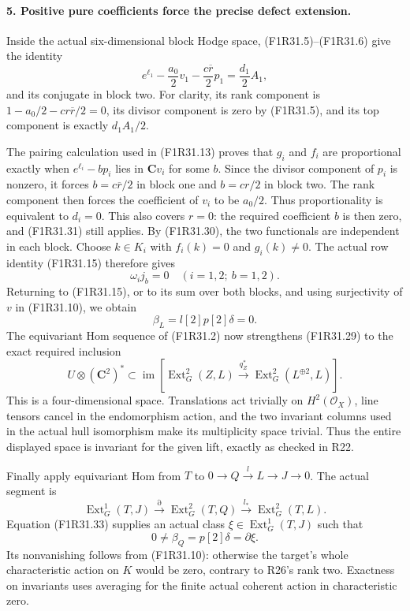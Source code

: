 \paragraph{5. Positive pure coefficients force the precise defect extension.}
Inside the actual six-dimensional block
Hodge space, (F1R31.5)--(F1R31.6) give
the identity
\[
 e^{\ell_1}-\frac{a_0}{2}v_1
                   -\frac{c\overline r}{2}p_1
                       =\frac{d_1}{2}A_1,
 \tag{F1R31.31}
\]
and its conjugate in block two.
For clarity, its rank component is
$1-a_0/2-cr\overline r/2=0$, its
divisor component is zero by
(F1R31.5), and its top component
is exactly $d_1A_1/2$.

The pairing calculation used in
(F1R31.13) proves that $g_i$ and
$f_i$ are proportional exactly when
$e^{\ell_i}-b p_i$ lies in
$\mathbf C v_i$ for some $b$.
Since the divisor component of
$p_i$ is nonzero, it forces
$b=c\overline r/2$ in block one
and $b=cr/2$ in block two.
The rank component then forces the
coefficient of $v_i$ to be $a_0/2$.
Thus proportionality is equivalent
to $d_i=0$. This also covers $r=0$:
the required coefficient $b$ is then
zero, and (F1R31.31) still applies.
By (F1R31.30), the two functionals
are independent in each block.
Choose $k\in K_i$ with
$f_i(k)=0$ and $g_i(k)\ne0$.
The actual row identity (F1R31.15)
therefore gives
\[
                            \omega_i j_b=0
                                 \quad(i=1,2;\ b=1,2).
 \tag{F1R31.32}
\]
Returning to (F1R31.15), or to its
sum over both blocks, and using
surjectivity of $v$ in (F1R31.10),
we obtain
\[
                              \beta_L=l[2]p[2]\delta=0.
 \tag{F1R31.33}
\]
The equivariant Hom sequence of
(F1R31.2) now strengthens (F1R31.29)
to the exact required inclusion
\[
 U\otimes(\mathbf C^2)^*
       \subset\operatorname{im}\left[
       \operatorname{Ext}^2_G(Z,L)
               \xrightarrow{q_Z^*}
               \operatorname{Ext}^2_G(L^{\oplus2},L)\right].
 \tag{F1R31.34}
\]
This is a four-dimensional space.
Translations act trivially on
$H^2(\mathcal O_X)$, line tensors
cancel in the endomorphism action,
and the two invariant columns used
in the actual hull isomorphism make
its multiplicity space trivial.
Thus the entire displayed space is
invariant for the given lift, exactly
as checked in R22.

Finally apply equivariant Hom from
$T$ to $0\to Q\xrightarrow{l}L\to J\to0$.
The actual segment is
\[
 \operatorname{Ext}^1_G(T,J)
        \xrightarrow{\partial}
 \operatorname{Ext}^2_G(T,Q)
        \xrightarrow{l_*}
 \operatorname{Ext}^2_G(T,L).
 \tag{F1R31.35}
\]
Equation (F1R31.33) supplies an actual
class $\xi\in\operatorname{Ext}^1_G(T,J)$
such that
\[
                      0\ne\beta_Q=p[2]\delta=\partial\xi.
 \tag{F1R31.36}
\]
Its nonvanishing follows from
(F1R31.10): otherwise the target's
whole characteristic action on $K$
would be zero, contrary to R26's
rank two. Exactness on invariants
uses averaging for the finite
actual coherent action in
characteristic zero.

